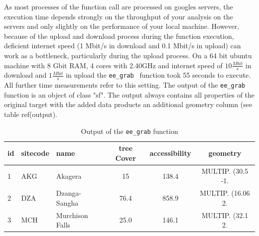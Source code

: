 As most processes of the function call are processed on googles servers, the execution time depends strongly on the throughput of your analysis on the servers and only slightly on the performance of your local machine. However, because of the upload and download process during the function execution, deficient internet speed (1 Mbit/s in download and 0.1 Mbit/s in upload) can work as a bottleneck, particularly during the upload process. 
On a 64 bit ubuntu machine with 8 Gbit RAM, 4 cores with 2.40GHz and internet speed of $10 \frac{Mbit}{s}$ in download and $1 \frac{Mbit}{s}$ in upload the \texttt{ee\_grab } function took 55 seconds to execute. All further time measurements refer to this setting.
The output of the \texttt{ee\_grab} function is an object of class "sf".  The output always contains all properties of the original target with the added data products an additional geometry column (see table ref(output).

\begin{table}[h]
	\begin{tabularx}{\textwidth}{lllccc}
		\hline
		id & sitecode & name & tree Cover & accessibility & geometry \\
		\hline
		1  & AKG  & Akagera & 15 & 138.4 & MULTIP. (30.5 -1.\\
		2 & DZA  & Dzanga-Sangha & 76.4 & 858.9 & MULTIP. (16.06 2.\\
		3 & MCH  & Murchison Falls & 25.0 & 146.1 & MULTIP. (32.1 2.\\
		
		\hline
	\end{tabularx}
	\caption{Output of the \texttt{ee\_grab} function}
	\label{output}
\end{table}



